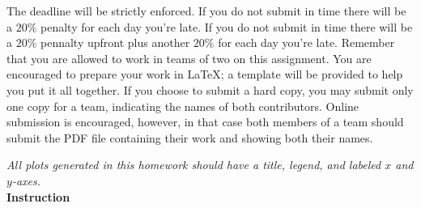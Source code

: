 %
%
%
The deadline will be strictly enforced. If you do not submit in time there will be a $20\%$ penalty for each day you're late. If you do not submit in time there will be a $20\%$ pennalty upfront plus another $20\%$ for  each day you're late. Remember that you are allowed to work in teams of two on this assignment. You are encouraged to prepare your work in \LaTeX{}; a template will be provided to help you put it all together. If you choose  to submit a hard copy, you may submit only one copy for a team, indicating the names of both contributors. Online submission is encouraged, however, in that case both members of a team should submit the PDF file containing  their work and showing both their names.

\emph{All plots generated in this homework should have a title, legend, and labeled $x$ and $y$-axes.} \\[15pt]

\textbf{Instruction}

